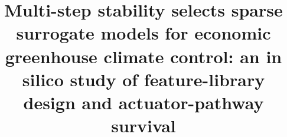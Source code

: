 \documentclass[11pt,a4paper]{article}

\usepackage[T1]{fontenc}
\usepackage[utf8]{inputenc}
\usepackage[english]{babel}
\usepackage{amsmath}
\usepackage{amssymb}
\usepackage{graphicx}
\usepackage{booktabs}
\usepackage{array}
\usepackage{caption}
\usepackage{xcolor}
\usepackage[margin=2.5cm]{geometry}
\usepackage{url}
\usepackage[hidelinks]{hyperref}

\graphicspath{{figures/}{./}}
\setlength{\parskip}{0.2\baselineskip}
\captionsetup{font=small,labelfont=bf}

\title{Multi-step stability selects sparse surrogate models for economic
greenhouse climate control: an in silico study of feature-library design and
actuator-pathway survival}


